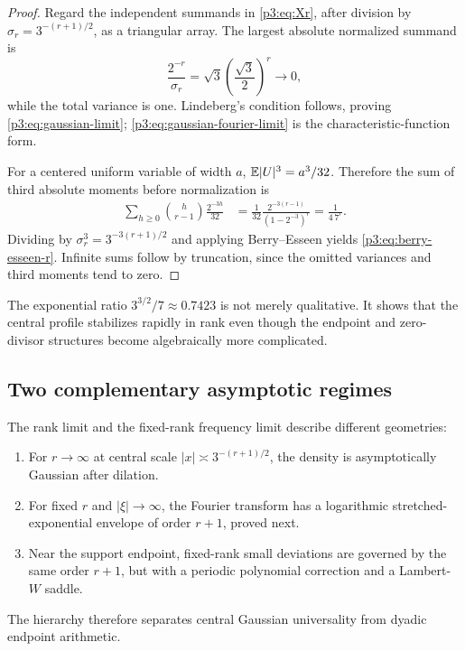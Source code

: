 \documentclass[11pt,oneside]{article}
\theoremstyle{definition}
\theoremstyle{remark}
\begin{document}
\begin{proof}
Regard the independent summands in \eqref{p3:eq:Xr}, after division by
$\sigma_r=3^{-(r+1)/2}$, as a triangular array.  The largest absolute normalized summand is
\[
 \frac{2^{-r}}{\sigma_r}
 =\sqrt3\left(\frac{\sqrt3}{2}\right)^r\longrightarrow0,
\]
while the total variance is one.  Lindeberg's condition follows, proving \eqref{p3:eq:gaussian-limit}; \eqref{p3:eq:gaussian-fourier-limit} is the characteristic-function form.

For a centered uniform variable of width $a$, $\mathbb E|U|^3=a^3/32$.  Therefore the sum of third absolute moments before normalization is
\begin{align*}
 \sum_{h\ge0}\binom h{r-1}\frac{2^{-3h}}{32}
 &=\frac1{32}\frac{2^{-3(r-1)}}{(1-2^{-3})^r}
 =\frac1{4\,7^r}.
\end{align*}
Dividing by $\sigma_r^3=3^{-3(r+1)/2}$ and applying Berry--Esseen yields \eqref{p3:eq:berry-esseen-r}.  Infinite sums follow by truncation, since the omitted variances and third moments tend to zero.
\end{proof}

\begin{remark}
The exponential ratio $3^{3/2}/7\approx0.7423$ is not merely qualitative.  It shows that the central profile stabilizes rapidly in rank even though the endpoint and zero-divisor structures become algebraically more complicated.
\end{remark}

\subsection{Two complementary asymptotic regimes}

The rank limit and the fixed-rank frequency limit describe different geometries:
\begin{enumerate}[label=(\alph*)]
\item For $r\to\infty$ at central scale $|x|\asymp3^{-(r+1)/2}$, the density is asymptotically Gaussian after dilation.
\item For fixed $r$ and $|\xi|\to\infty$, the Fourier transform has a logarithmic stretched-exponential envelope of order $r+1$, proved next.
\item Near the support endpoint, fixed-rank small deviations are governed by the same order $r+1$, but with a periodic polynomial correction and a Lambert-$W$ saddle.
\end{enumerate}
The hierarchy therefore separates central Gaussian universality from dyadic endpoint arithmetic.
\end{document}
